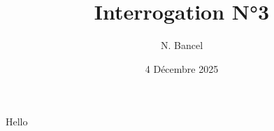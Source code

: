 \documentclass[answers]{exam}
\title{Interrogation N°3}
\author{N. Bancel}
\date{4 Décembre 2025}
\begin{document}
Hello
\end{document}
